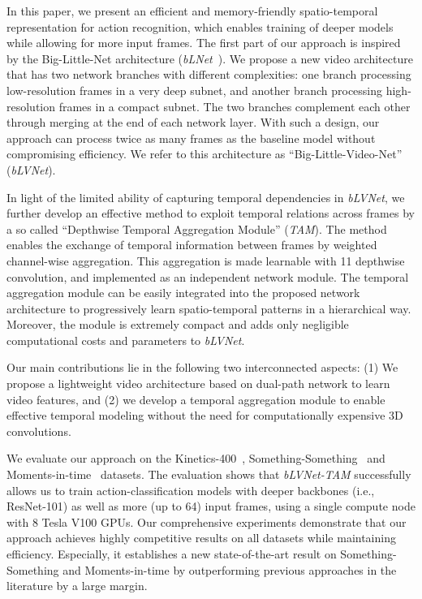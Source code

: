 \documentclass{article}
\def\blnet{\textit{bLNet}\xspace}
\def\blvnetnew{\textit{bLVNet}\xspace}
\def\DTA{\textit{bLVNet-TAM}\xspace}
\begin{document}
In this paper, we present an efficient and memory-friendly spatio-temporal representation for action recognition, which enables training of deeper models while allowing for more input frames. The first part of our approach is inspired by the Big-Little-Net architecture (\blnet~\cite{chen2018biglittle}). 
We propose a new video architecture that has two network branches with different complexities: one branch processing low-resolution frames in a very deep subnet, and another branch processing high-resolution frames in a compact subnet. The two branches complement each other through merging at the end of each network layer.
With such a design, our approach can process twice as many frames as the baseline model without compromising efficiency. We refer to this architecture as ``Big-Little-Video-Net'' (\blvnetnew).

In light of the limited ability of capturing temporal dependencies in \blvnetnew, we further develop an effective method to exploit temporal relations across frames by a so called ``Depthwise Temporal Aggregation Module'' (\textit{TAM}). The method enables the exchange of temporal information between frames by weighted channel-wise aggregation. This aggregation is made learnable with 11 depthwise convolution, and implemented as an independent network module. The temporal aggregation module can be easily integrated into the proposed network architecture to progressively learn spatio-temporal patterns in a hierarchical way. Moreover, the module is extremely compact and adds only negligible computational costs and parameters to \blvnetnew. 


Our main contributions lie in the following two interconnected aspects: 
(1) We propose a lightweight video architecture based on dual-path network to learn video features, and (2) we develop a temporal aggregation module to enable effective temporal modeling without the need for computationally expensive 3D convolutions. 

We evaluate our approach on the Kinetics-400~\cite{Kinetics:kay2017kinetics}, Something-Something~\cite{Something:goyal2017something} and Moments-in-time~\cite{Moments:monfort2019moments} datasets. 
The evaluation shows that \DTA successfully allows us to train action-classification models with deeper backbones (i.e., ResNet-101) as well as more (up to 64) input frames, using a single compute node with 8 Tesla V100 GPUs. Our comprehensive experiments demonstrate that our approach achieves highly competitive results on all datasets while maintaining efficiency.
Especially, it establishes a new state-of-the-art result on Something-Something and Moments-in-time by outperforming previous approaches in the literature by a large margin.
\end{document}
